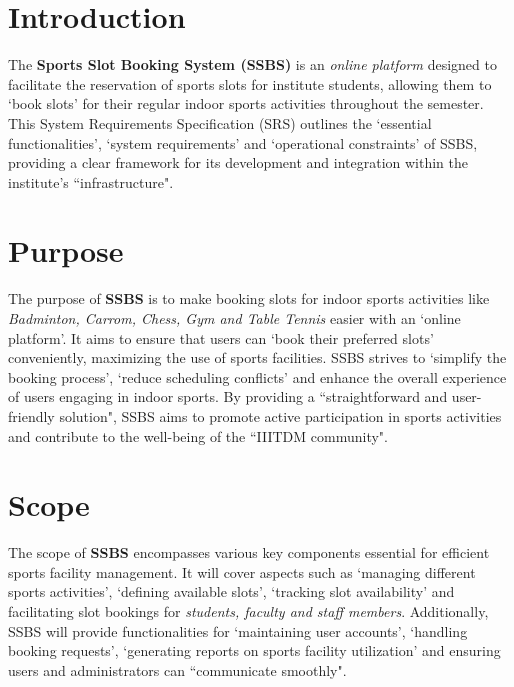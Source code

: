 \documentclass[12pt]{article}
\begin{document}
\newpage

\tableofcontents
\listoffigures

\newpage

\section{Introduction}
\hspace{0.8cm} The \textbf{Sports Slot Booking System (SSBS)} is an \textit{online platform} designed to facilitate the reservation of sports slots for institute students, allowing them to `book slots' for their regular indoor sports activities throughout the semester. This System Requirements Specification (SRS) outlines the `essential functionalities', `system requirements' and `operational constraints' of SSBS, providing a clear framework for its development and integration within the institute's ``infrastructure".

\vspace{0.4cm}

\section{Purpose}
\hspace{0.8cm} The purpose of \textbf{SSBS} is to make booking slots for indoor sports activities like \textit{Badminton, Carrom, Chess, Gym and Table Tennis} easier with an `online platform'. It aims to ensure that users can `book their preferred slots' conveniently, maximizing the use of sports facilities. SSBS strives to `simplify the booking process', `reduce scheduling conflicts' and enhance the overall experience of users engaging in indoor sports. By providing a ``straightforward and user-friendly solution", SSBS aims to promote active participation in sports activities and contribute to the well-being of the ``IIITDM community".

\vspace*{0.4cm}

\section{Scope}
\hspace{0.8cm} The scope of \textbf{SSBS} encompasses various key components essential for efficient sports facility management. It will cover aspects such as `managing different sports activities', `defining available slots', `tracking slot availability' and facilitating slot bookings for \textit{students, faculty and staff members}. Additionally, SSBS will provide functionalities for `maintaining user accounts', `handling booking requests', `generating reports on sports facility utilization' and ensuring users and administrators can ``communicate smoothly".
\end{document}

